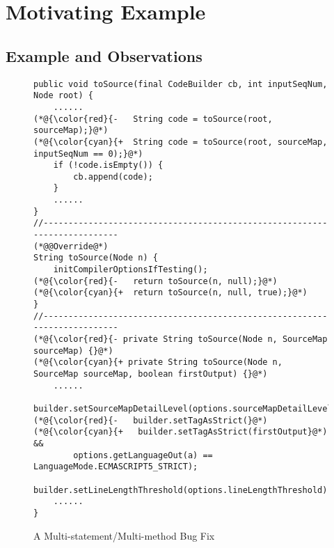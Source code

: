 \section{Motivating Example}
\label{motiv:section}

\subsection{Example and Observations}

\begin{figure}[t]
	\centering
	\begin{lstlisting}[]
public void toSource(final CodeBuilder cb, int inputSeqNum, Node root) {
	......
(*@{\color{red}{-	String code = toSource(root, sourceMap);}@*)
(*@{\color{cyan}{+	String code = toSource(root, sourceMap, inputSeqNum == 0);}@*)
	if (!code.isEmpty()) {
		cb.append(code);
	}
	......
}
//--------------------------------------------------------------------------
(*@@Override@*)
String toSource(Node n) {
	initCompilerOptionsIfTesting();
(*@{\color{red}{-	return toSource(n, null);}@*)
(*@{\color{cyan}{+ 	return toSource(n, null, true);}@*)
}
//--------------------------------------------------------------------------
(*@{\color{red}{- private String toSource(Node n, SourceMap sourceMap) {}@*)
(*@{\color{cyan}{+ private String toSource(Node n, SourceMap sourceMap, boolean firstOutput) {}@*)
	......
  builder.setSourceMapDetailLevel(options.sourceMapDetailLevel);
(*@{\color{red}{-   builder.setTagAsStrict(}@*)
(*@{\color{cyan}{+   builder.setTagAsStrict(firstOutput}@*) && 
		options.getLanguageOut(a) == LanguageMode.ECMASCRIPT5_STRICT);
  builder.setLineLengthThreshold(options.lineLengthThreshold);
	......	
}	
	\end{lstlisting}
        \vspace{-15pt}
        \caption{A Multi-statement/Multi-method Bug Fix}
        \vspace{-6pt}
        \label{fig:motiv}
\end{figure}

